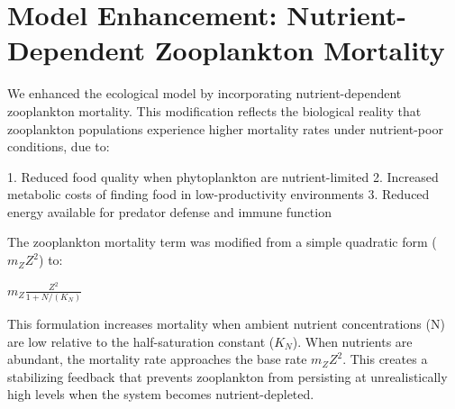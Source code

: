 \section{Model Enhancement: Nutrient-Dependent Zooplankton Mortality}

We enhanced the ecological model by incorporating nutrient-dependent zooplankton mortality. This modification reflects the biological reality that zooplankton populations experience higher mortality rates under nutrient-poor conditions, due to:

1. Reduced food quality when phytoplankton are nutrient-limited
2. Increased metabolic costs of finding food in low-productivity environments
3. Reduced energy available for predator defense and immune function

The zooplankton mortality term was modified from a simple quadratic form ($m_Z Z^2$) to:

$m_Z \frac{Z^2}{1 + N/(K_N)}$

This formulation increases mortality when ambient nutrient concentrations (N) are low relative to the half-saturation constant ($K_N$). When nutrients are abundant, the mortality rate approaches the base rate $m_Z Z^2$. This creates a stabilizing feedback that prevents zooplankton from persisting at unrealistically high levels when the system becomes nutrient-depleted.
